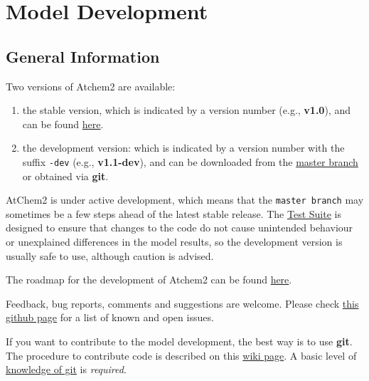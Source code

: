 %
%
%
%
\chapter{Model Development} \label{ch:development}

\section{General Information} \label{sec:information}

Two versions of Atchem2 are available:

\begin{enumerate}
\item the stable version, which is indicated by a version number
  (e.g., \textbf{v1.0}), and can be found
  \href{https://github.com/AtChem/AtChem2/releases}{here}.
\item the development version: which is indicated by a version number
  with the suffix \texttt{-dev} (e.g., \textbf{v1.1-dev}), and can be
  downloaded from the
  \href{https://github.com/AtChem/AtChem2/archive/master.zip}{master
    branch} or obtained via \textbf{git}.
\end{enumerate}

AtChem2 is under active development, which means that the
\texttt{master\ branch} may sometimes be a few steps ahead of the
latest stable release. The \hyperref[sec:testsuite]{Test Suite} is
designed to ensure that changes to the code do not cause unintended
behaviour or unexplained differences in the model results, so the
development version is usually safe to use, although caution is
advised.

The roadmap for the development of Atchem2 can be found
\href{https://github.com/AtChem/AtChem2/projects/1}{here}.

Feedback, bug reports, comments and suggestions are welcome. Please
check \href{https://github.com/AtChem/AtChem2/issues}{this github
  page} for a list of known and open issues.

If you want to contribute to the model development, the best way is to
use \textbf{git}. The procedure to contribute code is described
on this \href{https://github.com/AtChem/AtChem2/wiki/How-to-contribute}{wiki page}.
A basic level of \href{https://swcarpentry.github.io/git-novice/}{knowledge of git}
is \emph{required}.

